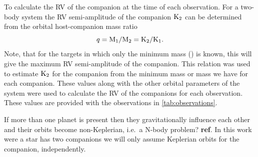 To calculate the {RV} of the companion at the time of each observation.
For a two-body system the {RV} semi-amplitude of the companion \(\textrm{K}_{2}\) can be determined from the orbital host-companion mass ratio
\begin{equation}
q = \textrm{M}_{1}/\textrm{M}_{2} = \textrm{K}_{2}/\textrm{K}_{1}\label{eqn:q_ratio_K2}.
\end{equation}
Note, that for the targets in which only the minimum mass (\mtwosini) is known, this will give the maximum {RV} semi-amplitude of the companion.
This relation was used to estimate \(\textrm{K}_{2}\) for the companion from the minimum mass or mass we have for each companion.
These values along with the other orbital parameters of the system were used to calculate the {RV} of the companions for each observation.
These values are provided with the observations in \cref{tab:observations}.




If more than one planet is present then they gravitationally influence each other and their orbits become non-Keplerian, i.e.\ a N-body problem? {\textbf{ref}}.
In this work were a star has two companions we will only assume Keplerian orbits for the companion, independently.
